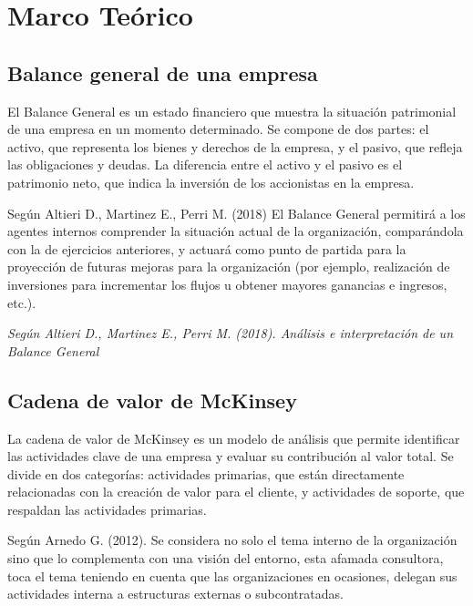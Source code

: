 \documentclass{article}
\newenvironment{marcoTeorico}{}{}
\begin{document}
\begin{marcoTeorico}
  \section{Marco Teórico}

  \subsection{Balance general de una empresa}

  El Balance General es un estado financiero que muestra la situación patrimonial de una empresa en un momento determinado. Se compone de dos partes: el activo, que representa los bienes y derechos de la empresa, y el pasivo, que refleja las obligaciones y deudas. La diferencia entre el activo y el pasivo es el patrimonio neto, que indica la inversión de los accionistas en la empresa.

  Según Altieri D., Martinez E., Perri M. (2018) El Balance General permitirá a los agentes internos comprender la situación actual de la organización, comparándola con la de ejercicios anteriores, y actuará como punto de partida para la proyección de futuras mejoras para la organización (por ejemplo, realización de inversiones para incrementar los flujos u obtener mayores ganancias e ingresos, etc.).

  \begin{flushright}
    \textit{Según Altieri D., Martinez E., Perri M. (2018). Análisis e interpretación de 
    un Balance General}
  \end{flushright}  

  \subsection{Cadena de valor de McKinsey}

  La cadena de valor de McKinsey es un modelo de análisis que permite identificar las actividades clave de una empresa y evaluar su contribución al valor total. Se divide en dos categorías: actividades primarias, que están directamente relacionadas con la creación de valor para el cliente, y actividades de soporte, que respaldan las actividades primarias.

  Según Arnedo G. (2012). Se considera no solo el tema interno de la organización sino que lo complementa con una visión del entorno, esta afamada consultora, toca el tema teniendo en cuenta que las organizaciones en ocasiones, delegan sus actividades interna a estructuras externas o subcontratadas.


\end{marcoTeorico}
\end{document}
